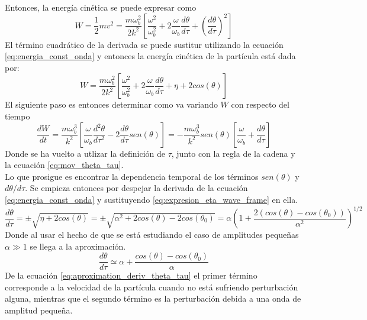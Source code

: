 Entonces, la energía cinética se puede expresar como
\begin{equation}
\label{eq:energia_cintetica_1}
W = \frac{1}{2}mv^2=\frac{m\omega_b^2}{2k^2}\left[\frac{\omega^2}{\omega_b^2}+2\frac{\omega}{\omega_b}\frac{d\theta}{d\tau}+\left(\frac{d\theta}{d\tau}\right)^2\right]
\end{equation}
El término cuadrático de la derivada se puede sustitur utilizando la ecuación \ref{eq:energia_const_onda} y entonces la energía cinética de la partícula está dada por:
\begin{equation}
\label{eq:energia_cinetica_2}
W = \frac{m\omega_b^2}{2k^2}\left[\frac{\omega^2}{\omega_b^2}+2\frac{\omega}{\omega_b}\frac{d\theta}{d\tau}+\eta+ 2cos(\theta)\right]
\end{equation}
El siguiente paso es entonces determinar como va variando $W$ con respecto del tiempo
\begin{equation}
\label{eq:derivada_temp_W_1}
\frac{dW}{dt}=\frac{m\omega_b^3}{k^2}\left[\frac{\omega}{\omega_b}\frac{d^2\theta}{d\tau^2}-2\frac{d\theta}{d\tau}sen(\theta)\right]=-\frac{m\omega_b^3}{k^2}sen(\theta)\left[\frac{\omega}{\omega_b}+\frac{d\theta}{d\tau}\right]
\end{equation}
Donde se ha vuelto a utlizar la definición de $\tau$, junto con la regla de la cadena y la ecuación \ref{eq:mov_theta_tau}.\\
Lo que prosigue es encontrar la dependencia temporal de los términos $sen(\theta)$ y $d\theta /d\tau$. Se empieza entonces por despejar la derivada de la ecuación \ref{eq:energia_const_onda} y sustituyendo \ref{eq:expresion_eta_wave_frame} en ella.
\begin{equation}
\label{eq:despeje_deriv_theta_tau}
\frac{d\theta}{d\tau}=\pm \sqrt{\eta + 2cos(\theta)}=\pm \sqrt{\alpha^2+2cos(\theta)-2cos(\theta_0)}=\alpha \left(1 + \frac{2(cos(\theta)-cos(\theta_0))}{\alpha^2}\right)^{1/2}
\end{equation}
Donde al usar el hecho de que se está estudiando el caso de amplitudes pequeñas $\alpha \gg 1$ se llega a la aproximación.
\begin{equation}
\label{eq:aproximation_deriv_theta_tau}
\frac{d\theta}{d\tau}\simeq \alpha + \frac{cos(\theta)-cos(\theta_0)}{\alpha}
\end{equation}
De la ecuación \ref{eq:aproximation_deriv_theta_tau} el primer término corresponde a la velocidad de la partícula cuando no está sufriendo perturbación alguna, mientras que el segundo término es la perturbación debida a una onda de amplitud pequeña.\\
